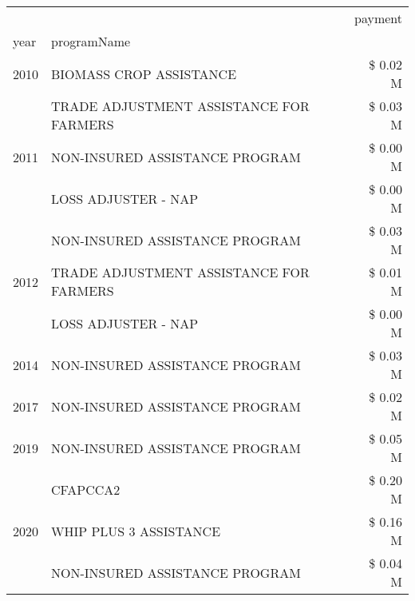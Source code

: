 \begin{tabular}{llr}
\toprule
 &  & payment \\
year & programName &  \\
\midrule
2010 & BIOMASS CROP ASSISTANCE & \$ 0.02 M \\
\cline{1-3}
\multirow[t]{3}{*}{2011} & TRADE ADJUSTMENT ASSISTANCE FOR FARMERS & \$ 0.03 M \\
 & NON-INSURED ASSISTANCE PROGRAM & \$ 0.00 M \\
 & LOSS ADJUSTER - NAP & \$ 0.00 M \\
\cline{1-3}
\multirow[t]{3}{*}{2012} & NON-INSURED ASSISTANCE PROGRAM & \$ 0.03 M \\
 & TRADE ADJUSTMENT ASSISTANCE FOR FARMERS & \$ 0.01 M \\
 & LOSS ADJUSTER - NAP & \$ 0.00 M \\
\cline{1-3}
2014 & NON-INSURED ASSISTANCE PROGRAM & \$ 0.03 M \\
\cline{1-3}
2017 & NON-INSURED ASSISTANCE PROGRAM & \$ 0.02 M \\
\cline{1-3}
2019 & NON-INSURED ASSISTANCE PROGRAM & \$ 0.05 M \\
\cline{1-3}
\multirow[t]{3}{*}{2020} & CFAPCCA2 & \$ 0.20 M \\
 & WHIP PLUS 3 ASSISTANCE & \$ 0.16 M \\
 & NON-INSURED ASSISTANCE PROGRAM & \$ 0.04 M \\
\cline{1-3}
\bottomrule
\end{tabular}
